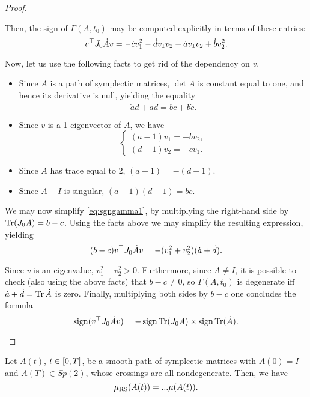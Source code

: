 \begin{proof}
\begin{enumerate}[label={Case \arabic*.}]
Then, the sign of $\Gamma(A,t_0)$ may be computed explicitly in terms of these entries:
\begin{equation}\label{eq:sgngamma1}
v^\top J_0 \dot A v = - \dot c v_1^2 - \dot d v_1 v_2 + \dot a v_1 v_2 + \dot b v_2^2.
\end{equation}

Now, let us use the following facts to get rid of the dependency on $v$.
\begin{itemize}
\item Since $A$ is a path of symplectic matrices, $\det A$ is constant equal to one, and hence its derivative is null, yielding the equality
\begin{equation}
\dot a d + a \dot d = \dot b c + b \dot c.
\end{equation}
\item Since $v$ is a 1-eigenvector of $A$, we have
\begin{equation}
\begin{cases}
(a-1)v_1 = - b v_2,\\
(d-1)v_2 = - c v_1.
\end{cases}
\end{equation}
\item Since $A$ has trace equal to 2, $(a-1) = - (d-1)$.
\item Since $A-I$ is singular, $(a-1)(d-1) = bc$.
\end{itemize}

We may now simplify \eqref{eq:sgngamma1}, by multiplying the right-hand side by $\operatorname{Tr}(J_0 A) = b-c$. Using the facts above we may simplify the resulting expression, yielding
\begin{equation}\label{eq:sgngamma2}
(b-c) v^\top J_0 \dot A v = - (v_1^2 + v_2^2)(\dot a + \dot d).
\end{equation}

Since $v$ is an eigenvalue, $v_1^2 + v_2^2 > 0$. Furthermore, since $A \neq I$, it is possible to check (also using the above facts) that $b-c \neq 0$, so $\Gamma(A,t_0)$ is degenerate iff $\dot a + \dot d = \operatorname{Tr} \dot A$ is zero. Finally, multiplying both sides by $b-c$ one concludes the formula
\begin{equation}
\operatorname{sign}(v^\top J_0 \dot A v) = - \operatorname{sign} \operatorname{Tr}(J_0 A) \times \operatorname{sign} \operatorname{Tr}(\dot A).
\end{equation}
\end{enumerate}
\end{proof}

\begin{prop}
Let $A(t)$, $t \in \interval0T$, be a smooth path of symplectic matrices with $A(0) = I$ and $A(T) \in Sp(2)$, whose crossings are all nondegenerate. Then, we have
\begin{equation}
\mu_{\mathrm{RS}}(A(t)) = ... \mu(A(t)).
\end{equation}
\end{prop}

